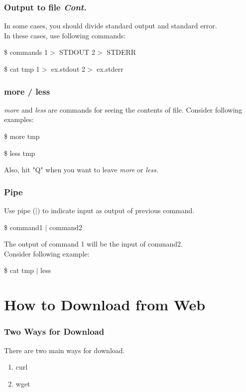 \documentclass{beamer}
\begin{document}
	\begin{frame}
		\frametitle{Output to file \textit{Cont.}}
		In some cases, you should divide standard output and standard error. \\
		In these cases, use following commands:
		\begin{example}
			\$ commands 1$>$ STDOUT 2$>$ STDERR
		\end{example}
	
		\begin{example}
			\$ cat tmp 1$>$ ex.stdout 2$>$ ex.stderr 
		\end{example}
	\end{frame}

	\begin{frame}
		\frametitle{more / less}
		\textit{more} and \textit{less} are commands for seeing the contents of file.
		Consider following examples:
		\begin{example}
			\$ more tmp
		\end{example}
	
		\begin{example}
			\$ less tmp
		\end{example}
	
		Also, hit "Q" when you want to leave \textit{more} or \textit{less}. 
	\end{frame}

	\begin{frame}
		\frametitle{Pipe}
		Use pipe ($|$) to indicate input as output of previous command.
		\begin{example}
			\$ command1 $|$ command2
		\end{example}
		The output of command 1 will be the input of command2. \\
		Consider following example: 
		\begin{example}
			\$ cat tmp $|$ less
		\end{example}
	\end{frame}
	
	\section{How to Download from Web}
	
	\begin{frame}
		\frametitle{Two Ways for Download}
		There are two main ways for download.
		\begin{enumerate}
			\item curl
			\item wget
		\end{enumerate}
	\end{frame}
\end{document}
